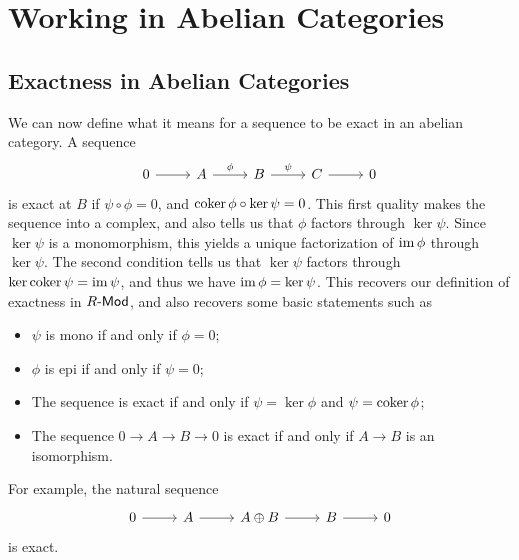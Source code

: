 \section{Working in Abelian Categories}
\subsection{Exactness in Abelian Categories}
We can now define what it means for a sequence to be exact in an abelian category. A sequence
\[\begin{tikzcd}[row sep = 2.5em, column sep = 2.5em]
	0\arrow[r]&A\arrow[r, "\phi "]&B\arrow[r, "\psi "]&C\arrow[r]&0
\end{tikzcd}\]
is exact at $B$ if $\psi \circ \phi =0$, and $\operatorname{coker} \phi \circ \ker \psi =0$. This first quality makes the sequence into a complex, and also tells us that $\phi $ factors through $\ker \psi $. Since $\ker \psi $ is a monomorphism, this yields a unique factorization of $\operatorname{im} \phi $ through $\ker \psi $. The second condition tells us that $\ker \psi $ factors through $\ker \operatorname{coker} \psi =\operatorname{im} \psi $, and thus we have $\operatorname{im} \phi =\ker \psi $. This recovers our definition of exactness in $R\text{-}\mathsf{Mod} $, and also recovers some basic statements such as
\begin{itemize}
	\item $\psi $ is mono if and only if $\phi =0$;
	\item $\phi $ is epi if and only if $\psi =0$;
	\item The sequence is exact if and only if $\psi =\ker \phi $ and $\psi =\operatorname{coker} \phi $;
	\item The sequence $0\to A\to B\to 0$ is exact if and only if $A\to B$ is an isomorphism.
\end{itemize}
For example, the natural sequence
\[\begin{tikzcd}[row sep = 2.5em, column sep = 2.5em]
	0\arrow[r]&A\arrow[r]&A\oplus B\arrow[r]&B\arrow[r]&0
\end{tikzcd}\]
is exact. 
